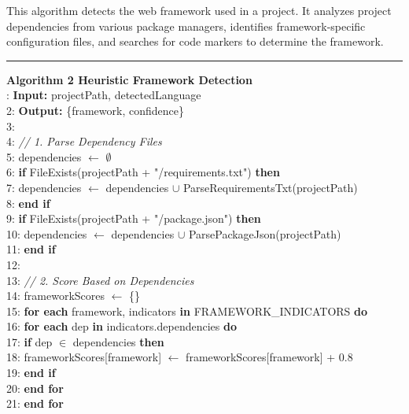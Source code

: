 This algorithm detects the web framework used in a project. It analyzes project dependencies from various package managers, identifies framework-specific configuration files, and searches for code markers to determine the framework.

\noindent\rule{\textwidth}{0.4pt}
\textbf{Algorithm 2 Heuristic Framework Detection}\\
: \textbf{Input:} projectPath, detectedLanguage\\
2: \textbf{Output:} \{framework, confidence\}\\
3:\\
4: \textit{// 1. Parse Dependency Files}\\
5: dependencies $\leftarrow$ $\emptyset$\\
6: \textbf{if} FileExists(projectPath + "/requirements.txt") \textbf{then}\\
7: \hspace{0.5cm}dependencies $\leftarrow$ dependencies $\cup$ ParseRequirementsTxt(projectPath)\\
8: \textbf{end if}\\
9: \textbf{if} FileExists(projectPath + "/package.json") \textbf{then}\\
10: \hspace{0.5cm}dependencies $\leftarrow$ dependencies $\cup$ ParsePackageJson(projectPath)\\
11: \textbf{end if}\\
12:\\
13: \textit{// 2. Score Based on Dependencies}\\
14: frameworkScores $\leftarrow$ \{\}\\
15: \textbf{for each} framework, indicators \textbf{in} FRAMEWORK\_INDICATORS \textbf{do}\\
16: \hspace{0.5cm}\textbf{for each} dep \textbf{in} indicators.dependencies \textbf{do}\\
17: \hspace{1cm}\textbf{if} dep $\in$ dependencies \textbf{then}\\
18: \hspace{1.5cm}frameworkScores[framework] $\leftarrow$ frameworkScores[framework] + 0.8\\
19: \hspace{1cm}\textbf{end if}\\
20: \hspace{0.5cm}\textbf{end for}\\
21: \textbf{end for}\\
